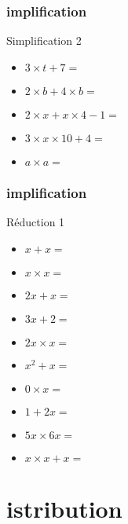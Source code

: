 \documentclass{beamer}
\begin{document}
\begin{frame}
  \frametitle{implification}
  \begin{exampleblock}{Simplification 2}
    \begin{itemize}
    \item<1-> $ 3 \times t + 7              = $
    \item<2-> $ 2 \times b + 4 \times b     = $
    \item<3-> $ 2 \times x + x \times 4 - 1 = $
    \item<4-> $ 3 \times x \times 10 + 4    = $
    \item<5-> $ a \times a                  = $
    \end{itemize}
  \end{exampleblock}
\end{frame}

\begin{frame}
  \frametitle{implification}
  \begin{exampleblock}{Réduction 1}
  \begin{multicols}{2}
    \begin{itemize}
    \item<1-> $ x + x                      = $
    \item<2-> $ x \times x                 = $
    \item<3-> $ 2x + x                     = $
    \item<4-> $ 3x + 2                     = $
    \item<5-> $ 2x \times x                = $
    \item<6-> $ x^2 + x                    = $
    \item<7-> $ 0 \times x                  = $
    \item<8-> $ 1 + 2x                      = $    
    \item<9-> $  5x \times 6x               = $  
    \item<10-> $ x \times x + x              = $
    \end{itemize}
    \end{multicols}
  \end{exampleblock}
\end{frame}


\section{istribution}
\end{document}
